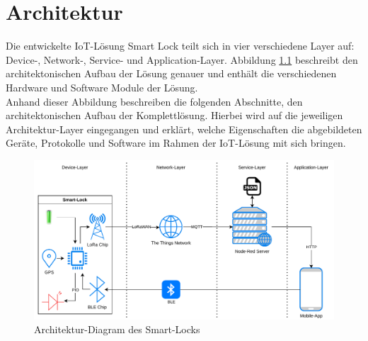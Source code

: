 
\chapter{Architektur}
Die entwickelte \ac{IoT}-Lösung Smart Lock teilt sich in vier verschiedene Layer auf: Device-, Network-, Service- und Application-Layer. Abbildung \ref{fig:architektur} beschreibt den architektonischen Aufbau der Lösung genauer und enthält die verschiedenen Hardware und Software Module der Lösung. \\
Anhand dieser Abbildung beschreiben die folgenden Abschnitte, den architektonischen Aufbau der Komplettlösung. Hierbei wird auf die jeweiligen Architektur-Layer eingegangen und erklärt, welche Eigenschaften die abgebildeten Geräte, Protokolle und Software im Rahmen der \ac{IoT}-Lösung mit sich bringen.

\begin{figure}[!htbp]
    \centering
    \includegraphics[width=1\linewidth]{images/architecture_smart_lock.pdf}
    \caption[Architektur-Diagram des Smart-Locks]{Architektur-Diagram des Smart-Locks}
    \label{fig:architektur}
\end{figure}




